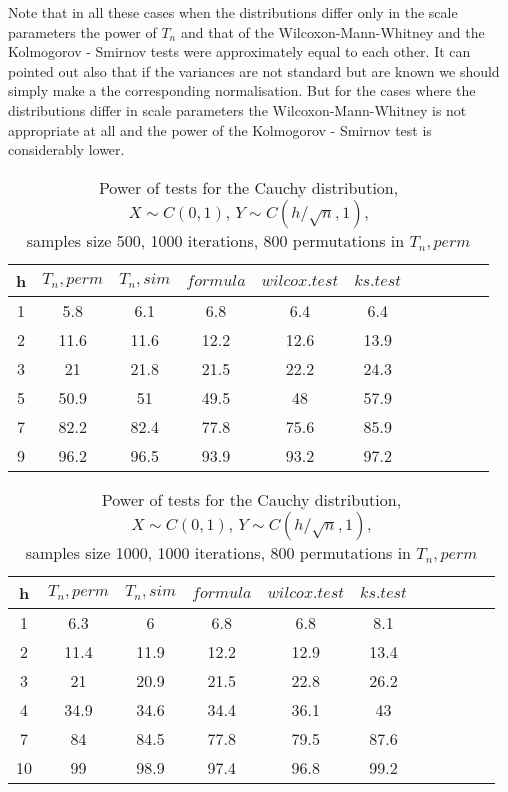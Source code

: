 \documentclass[final,11pt,3p]{elsarticle}
\begin{document}
Note that in all these cases when the distributions differ only in the scale parameters the power of  $T_n$ and  that of the Wilcoxon-Mann-Whitney and the
Kolmogorov - Smirnov tests were approximately equal to each other.
It can pointed out also that if the variances are not standard  but are known we should simply make a the corresponding normalisation.
But for the cases where the distributions differ in scale parameters the Wilcoxon-Mann-Whitney is not appropriate at all and the power of  the Kolmogorov - Smirnov test is considerably lower.



\begin{longtable}{|c|c|c|c|c|c|c|c|c|c|c|}
  \caption{Power of tests for the Cauchy distribution, \\
           $X\sim C(0,1)$, $Y\sim C(h/\sqrt{n},1)$, \\
           samples size 500, 1000 iterations, 800 permutations in $T_n, perm$} \\
  \hline
  h & $T_n, perm$ & $T_n, sim$ & $formula$ & $wilcox.test$ & $ks.test$ \\ \hline
  1 & 5.8   & 6.1      & 6.8       & 6.4           & 6.4       \\
  2 & 11.6  & 11.6     & 12.2      & 12.6          & 13.9      \\
  3 & 21    & 21.8     & 21.5      & 22.2          & 24.3      \\
  5 & 50.9  & 51       & 49.5      & 48            & 57.9      \\
  7 & 82.2  & 82.4     & 77.8      & 75.6          & 85.9      \\
  9 & 96.2  & 96.5     & 93.9      & 93.2          & 97.2      \\ \hline
\end{longtable}

\begin{longtable}{|c|c|c|c|c|c|c|c|c|c|c|}
  \caption{Power of tests for the Cauchy distribution, \\
           $X\sim C(0,1)$, $Y\sim C(h/\sqrt{n},1)$, \\
           samples size 1000, 1000 iterations, 800 permutations in $T_n, perm$} \\
  \hline
  h  & $T_n, perm$ & $T_n, sim$ & $formula$ & $wilcox.test$ & $ks.test$ \\ \hline
  1  & 6.3   & 6        & 6.8       & 6.8           & 8.1       \\
  2  & 11.4  & 11.9     & 12.2      & 12.9          & 13.4      \\
  3  & 21    & 20.9     & 21.5      & 22.8          & 26.2      \\
  4  & 34.9  & 34.6     & 34.4      & 36.1          & 43        \\
  7  & 84    & 84.5     & 77.8      & 79.5          & 87.6      \\
  10 & 99    & 98.9     & 97.4      & 96.8          & 99.2      \\ \hline
\end{longtable}
\end{document}
